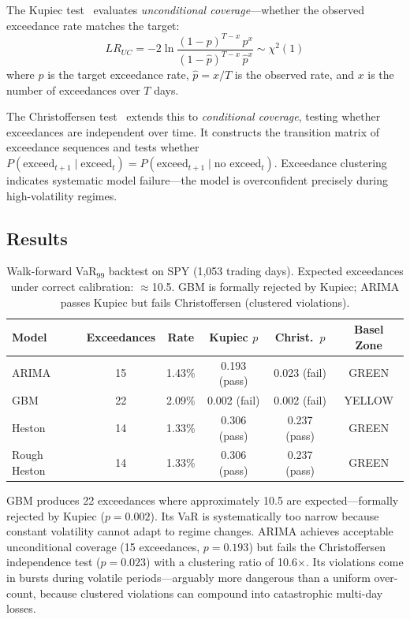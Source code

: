 \documentclass[11pt,a4paper]{article}
\begin{document}
The Kupiec test~\cite{kupiec1995} evaluates \textit{unconditional coverage}---whether the observed exceedance rate matches the target:
\begin{equation}
LR_{UC} = -2 \ln \frac{(1-p)^{T-x}\, p^x}{(1-\hat{p})^{T-x}\, \hat{p}^x} \sim \chi^2(1)
\end{equation}
where $p$ is the target exceedance rate, $\hat{p} = x/T$ is the observed rate, and $x$ is the number of exceedances over $T$ days.

The Christoffersen test~\cite{christoffersen1998} extends this to \textit{conditional coverage}, testing whether exceedances are independent over time. It constructs the transition matrix of exceedance sequences and tests whether $P(\text{exceed}_{t+1} \mid \text{exceed}_t) = P(\text{exceed}_{t+1} \mid \text{no exceed}_t)$. Exceedance clustering indicates systematic model failure---the model is overconfident precisely during high-volatility regimes.

\subsection{Results}

\begin{table}[H]
\centering
\begin{tabular}{lccccc}
\toprule
\textbf{Model} & \textbf{Exceedances} & \textbf{Rate} & \textbf{Kupiec $p$} & \textbf{Christ.\ $p$} & \textbf{Basel Zone} \\
\midrule
ARIMA         & 15 & 1.43\% & 0.193 (pass) & 0.023 (fail) & GREEN \\
GBM           & 22 & 2.09\% & 0.002 (fail) & 0.002 (fail) & YELLOW \\
Heston        & 14 & 1.33\% & 0.306 (pass) & 0.237 (pass) & GREEN \\
Rough Heston  & 14 & 1.33\% & 0.306 (pass) & 0.237 (pass) & GREEN \\
\bottomrule
\end{tabular}
\caption{Walk-forward VaR$_{99}$ backtest on SPY (1{,}053 trading days). Expected exceedances under correct calibration: $\approx$10.5. GBM is formally rejected by Kupiec; ARIMA passes Kupiec but fails Christoffersen (clustered violations).}
\label{tab:backtest}
\end{table}

GBM produces 22 exceedances where approximately 10.5 are expected---formally rejected by Kupiec ($p = 0.002$). Its VaR is systematically too narrow because constant volatility cannot adapt to regime changes. ARIMA achieves acceptable unconditional coverage (15 exceedances, $p = 0.193$) but fails the Christoffersen independence test ($p = 0.023$) with a clustering ratio of 10.6$\times$. Its violations come in bursts during volatile periods---arguably more dangerous than a uniform over-count, because clustered violations can compound into catastrophic multi-day losses.
\end{document}
